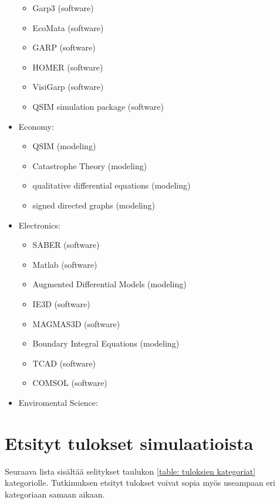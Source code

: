 \documentclass[utf8]{gradu3}
\begin{document}
\begin{itemize}
\begin{itemize}
        \item Garp3 (software)
        \item EcoMata (software)
        \item GARP (software)
        \item HOMER (software)
        \item VisiGarp (software)
        \item QSIM simulation package (software)
    \end{itemize}
    \item Economy:
    \begin{itemize}
        \item QSIM (modeling)
        \item Catastrophe Theory (modeling)
        \item qualitative differential equations (modeling)
        \item signed directed graphs (modeling)
    \end{itemize}
    \item Electronics:
    \begin{itemize}
        \item SABER (software)
        \item Matlab (software)
        \item Augmented Differential Models (modeling)
        \item IE3D (software)
        \item MAGMAS3D (software)
        \item Boundary Integral Equations (modeling)
        \item TCAD (software)
        \item COMSOL (software)
    \end{itemize}
    \item Enviromental Science:
    
\end{itemize}


\section{Etsityt tulokset simulaatioista} \label{simulaatiotulokset}
Seuraava lista sisältää selitykset taulukon \ref{table: tuloksien kategoriat} kategoriolle.
Tutkimuksen etsityt tulokset voivat sopia myös useampaan eri kategoriaan samaan aikaan. 
\end{document}

